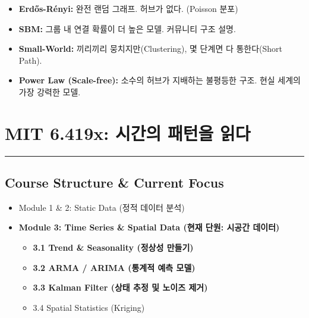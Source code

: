 \documentclass[11pt,a4paper]{book}
\theoremstyle{definition}
\begin{document}
\begin{summarybox}[title={Module 2 (Part C) 핵심 요약}]
\begin{itemize}
    \item \textbf{Erdős-Rényi:} 완전 랜덤 그래프. 허브가 없다. (Poisson 분포)
    \item \textbf{SBM:} 그룹 내 연결 확률이 더 높은 모델. 커뮤니티 구조 설명.
    \item \textbf{Small-World:} 끼리끼리 뭉치지만(Clustering), 몇 단계면 다 통한다(Short Path).
    \item \textbf{Power Law (Scale-free):} 소수의 허브가 지배하는 불평등한 구조. 현실 세계의 가장 강력한 모델.
\end{itemize}
\end{summarybox}


\chapter{MIT 6.419x: 시간의 패턴을 읽다}
\label{ch:lecture7}


\vspace{1cm}
\hrule
\vspace{1cm}

\section*{Course Structure \& Current Focus}
\begin{itemize}
    \item Module 1 \& 2: Static Data (정적 데이터 분석)
    \item \textbf{\textcolor{mainblue}{Module 3: Time Series \& Spatial Data (현재 단원: 시공간 데이터)}}
    \begin{itemize}
        \item \textbf{3.1 Trend \& Seasonality (정상성 만들기)}
        \item \textbf{3.2 ARMA / ARIMA (통계적 예측 모델)}
        \item \textbf{3.3 Kalman Filter (상태 추정 및 노이즈 제거)}
        \item 3.4 Spatial Statistics (Kriging)
    \end{itemize}
\end{itemize}
\end{document}
